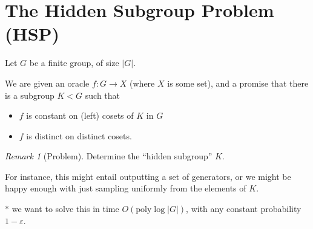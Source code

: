 \documentclass[]{article}
\theoremstyle{custhm}
\theoremstyle{cusdef}
\theoremstyle{custhm}
\theoremstyle{custhm}
\theoremstyle{custhm}
\theoremstyle{custhm}
\theoremstyle{cusdef}
\theoremstyle{remark}
\newtheorem*{remark*}{Remark}
\newcommand{\ra}{\rightarrow}
\newcommand{\eps}{\varepsilon}
\newcommand{\poly}{\textrm{poly}}
\begin{document}
\section{The Hidden Subgroup Problem (HSP)}

Let $G$ be a finite group, of size $|G|$.

We are given an oracle $f : G\ra X$ (where $X$ is some set), and a promise that there is a subgroup $K < G$ such that
\begin{itemize}
	\item $f$ is constant on (left) cosets of $K$ in $G$
	\item $f$ is distinct on distinct cosets.
\end{itemize}
\begin{remark*}[Problem]
Determine the ``hidden subgroup'' $K$.

For instance, this might entail outputting a set of generators, or we might be happy enough with just sampling uniformly from the elements of $K$.

$\ast$ we want to solve this in time $O(\poly\log|G|)$, with any constant probability $1 - \eps$.
\end{remark*}
\end{document}
